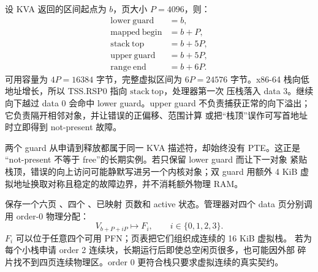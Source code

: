 \begin{center}
\end{center}

设 KVA 返回的区间起点为 \(b\)，页大小 \(P=4096\)，则：
\[
\begin{aligned}
  \mathrm{lower\ guard} &= b,\\
  \mathrm{mapped\ begin} &= b+P,\\
  \mathrm{stack\ top} &= b+5P,\\
  \mathrm{upper\ guard} &= b+5P,\\
  \mathrm{range\ end} &= b+6P.
\end{aligned}
\]
可用容量为 \(4P=16384\) 字节，完整虚拟区间为 \(6P=24576\) 字节。x86-64
栈向低地址增长，所以 TSS.RSP0 指向 \(\mathrm{stack\ top}\)，处理器第一次
压栈落入 data 3。继续向下越过 data 0 会命中 lower guard。upper guard
不负责捕获正常的向下溢出；它负责隔开相邻对象，并让错误的正偏移、范围计算
或把“栈顶”误作可写首地址时立即得到 not-present 故障。

两个 guard 从申请到释放都属于同一 KVA 描述符，却始终没有 PTE。这正是
“not-present 不等于 free”的长期实例。若只保留 lower guard 而让下一对象
紧贴栈顶，错误的向上访问可能静默写进另一个内核对象；双 guard 用额外 4 KiB
虚拟地址换取对称且稳定的故障边界，并不消耗额外物理 RAM。

 保存一个六页
、四个 、已映射
页数和 active 状态。管理器对四个 data 页分别调用 order-0 物理分配：
\[
  V_{b+P+iP}\longmapsto F_i,\qquad i\in\{0,1,2,3\}.
\]
\(F_i\) 可以位于任意四个可用 PFN；页表把它们组织成连续的 16 KiB 虚拟栈。
若为每个小栈申请 order 2 连续块，长期运行后即使总空闲页很多，也可能因外部
碎片找不到四页连续物理区。order 0 更符合栈只要求虚拟连续的真实契约。

